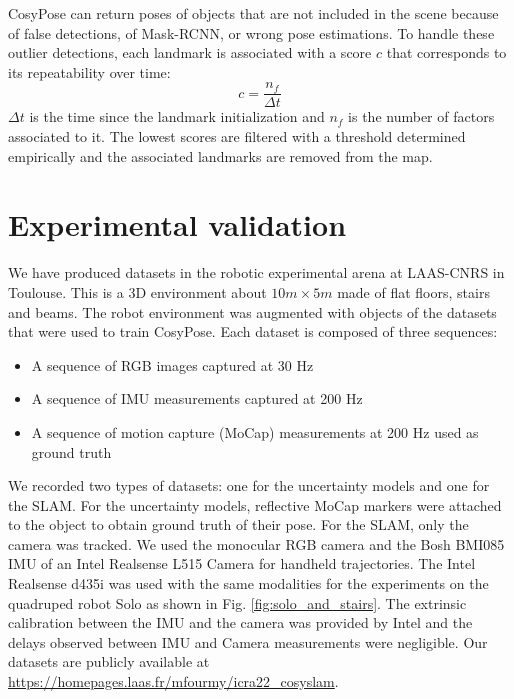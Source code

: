 CosyPose can return poses of objects that are not included in the scene because of false detections, of Mask-RCNN, or wrong pose estimations. To handle these outlier detections, each landmark is associated with a score $c$ that corresponds to its repeatability over time: 
\begin{equation}
    c = \frac{n_f}{\Delta t}
\end{equation}
$\Delta t$ is the time since the landmark initialization and $n_f$ is the number of factors associated to it.
The lowest scores are filtered with a threshold determined empirically and the associated landmarks are removed from the map.






\section{Experimental validation}

We have produced datasets in the robotic experimental arena at LAAS-CNRS in Toulouse. This is a 3D environment about $10 m \times 5m$ made of flat floors, stairs and beams. The robot environment was augmented with objects of the datasets that were used to train CosyPose. Each dataset is composed of three sequences:

\begin{itemize}
    \item A sequence of RGB images captured at 30 Hz
    \item A sequence of IMU measurements captured at 200 Hz
    \item A sequence of motion capture (MoCap) measurements at 200 Hz used as ground truth 
\end{itemize}

We recorded two types of datasets: one for the uncertainty models and one for the SLAM. For the uncertainty models, reflective MoCap markers were attached to the object to obtain ground truth of their pose. For the SLAM, only the camera was tracked. We used the monocular RGB camera and the Bosh BMI085 IMU of an Intel Realsense L515 Camera for handheld trajectories. The Intel Realsense d435i was used with the same modalities for the experiments on the quadruped robot Solo \cite{grimminger2020open} as shown in Fig. \ref{fig:solo_and_stairs}. The extrinsic calibration between the IMU and the camera was provided by Intel and the delays observed between IMU and Camera measurements were negligible. Our datasets are publicly available at \url{https://homepages.laas.fr/mfourmy/icra22_cosyslam}.

